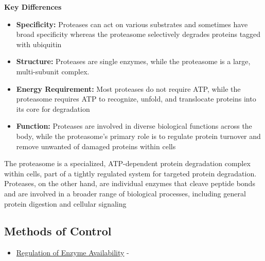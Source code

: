 \documentclass[10pt]{article}
\begin{document}
\textbf{Key Differences}
\begin{itemize}
    \item \textbf{Specificity:} Proteases can act on various substrates and sometimes have broad specificity whereas the proteasome selectively degrades proteins tagged with ubiquitin
    \item \textbf{Structure:} Proteases are single enzymes, while the proteasome is a large, multi-subunit complex.
    \item \textbf{Energy Requirement:} Most proteases do not require ATP, while the proteasome requires ATP to recognize, unfold, and translocate proteins into its core for degradation
    \item \textbf{Function:} Proteases are involved in diverse biological functions across the body, while the proteasome's primary role is to regulate protein turnover and remove unwanted of damaged proteins within cells
\end{itemize}
The proteasome is a specialized, ATP-dependent protein degradation complex within cells, part of a tightly regulated system for targeted protein degradation. Proteases, on the other hand, are individual enzymes that cleave peptide bonds and are involved in a broader range of biological processes, including general protein digestion and cellular signaling

\subsection*{Methods of Control}
\begin{itemize}
    \item \underline{Regulation of Enzyme Availability} - 
\end{itemize}
\end{document}
